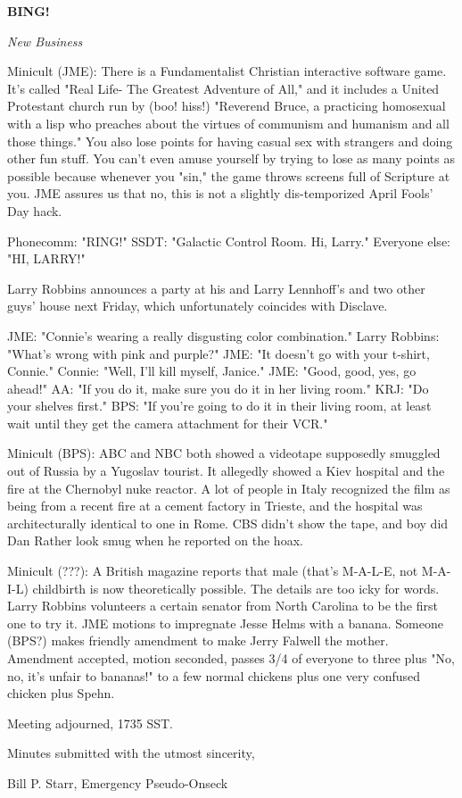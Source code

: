 \documentclass[12pt]{article}
\newcommand{\bing}{{\bf BING!} }
\newcommand{\goto}[1]{\bing \vskip 12pt \centerline{{\em{#1}}}}
\begin{document}
\goto{New Business}

Minicult (JME): There is a Fundamentalist Christian interactive software game. It's called "Real Life- The Greatest Adventure of All," and it includes a United Protestant church run by (boo! hiss!) "Reverend Bruce, a practicing homosexual with a lisp who preaches about the virtues of communism and humanism and all those things." You also lose points for having casual sex with strangers and doing other fun stuff. You can't even amuse yourself by trying to lose as many points as possible because whenever you "sin," the game throws screens full of Scripture at you. JME assures us that no, this is not a slightly dis-temporized April Fools' Day hack.

Phonecomm: "RING!" SSDT: "Galactic Control Room. Hi, Larry." Everyone else: "HI, LARRY!"

Larry Robbins announces a party at his and Larry Lennhoff's and two other guys' house next Friday, which unfortunately coincides with Disclave.

JME: "Connie's wearing a really disgusting color combination." Larry Robbins: "What's wrong with pink and purple?" JME: "It doesn't go with your t-shirt, Connie." Connie: "Well, I'll kill myself, Janice." JME: "Good, good, yes, go ahead!" AA: "If you do it, make sure you do it in her living room." KRJ: "Do your shelves first." BPS: "If you're going to do it in their living room, at least wait until they get the camera attachment for their VCR."

Minicult (BPS): ABC and NBC both showed a videotape supposedly smuggled out of Russia by a Yugoslav tourist. It allegedly showed a Kiev hospital and the fire at the Chernobyl nuke reactor. A lot of people in Italy recognized the film as being from a recent fire at a cement factory in Trieste, and the hospital was architecturally identical to one in Rome. CBS didn't show the tape, and boy did Dan Rather look smug when he reported on the hoax.

Minicult (???): A British magazine reports that male (that's M-A-L-E, not M-A-I-L) childbirth is now theoretically possible. The details are too icky for words. Larry Robbins volunteers a certain senator from North Carolina to be the first one to try it. JME motions to impregnate Jesse Helms with a banana. Someone (BPS?) makes friendly amendment to make Jerry Falwell the mother. Amendment accepted, motion seconded, passes 3/4 of everyone to three plus "No, no, it's unfair to bananas!" to a few normal chickens plus one very confused chicken plus Spehn.

\vspace{12pt}

\noindent
Meeting adjourned, 1735 SST.

\vspace{18pt}

\centerline{Minutes submitted with the utmost sincerity,}
\centerline{Bill P. Starr, Emergency Pseudo-Onseck}
\end{document}
